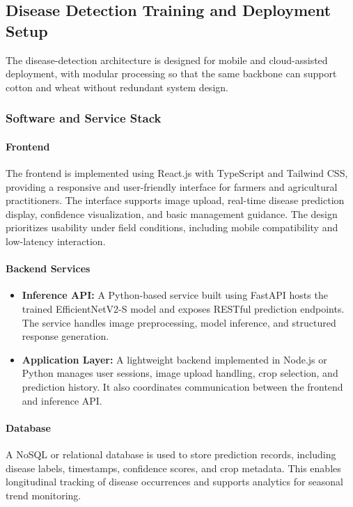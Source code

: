 \documentclass[conference]{IEEEtran}
\begin{document}
\subsection{Disease Detection Training and Deployment Setup}
The disease-detection architecture is designed for mobile and cloud-assisted deployment, with modular processing so that the same backbone can support cotton and wheat without redundant system design.

\subsubsection{Software and Service Stack}

\paragraph{Frontend}
The frontend is implemented using React.js with TypeScript and Tailwind CSS, providing a responsive and user-friendly interface for farmers and agricultural practitioners. The interface supports image upload, real-time disease prediction display, confidence visualization, and basic management guidance. The design prioritizes usability under field conditions, including mobile compatibility and low-latency interaction.

\paragraph{Backend Services}
\begin{itemize}
\item \textbf{Inference API:} A Python-based service built using FastAPI hosts the trained EfficientNetV2-S model and exposes RESTful prediction endpoints. The service handles image preprocessing, model inference, and structured response generation.
\item \textbf{Application Layer:} A lightweight backend implemented in Node.js or Python manages user sessions, image upload handling, crop selection, and prediction history. It also coordinates communication between the frontend and inference API.
\end{itemize}

\paragraph{Database}
A NoSQL or relational database is used to store prediction records, including disease labels, timestamps, confidence scores, and crop metadata. This enables longitudinal tracking of disease occurrences and supports analytics for seasonal trend monitoring.
\end{document}
